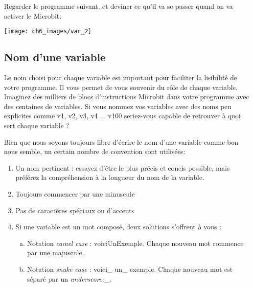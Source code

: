 \documentclass[11pt, a4paper]{book}
\begin{document}
	
	

	
	
	
\begin{exercice}
 Regarder le programme suivant, et deviner ce qu'il va se passer quand on va activer le Microbit:

\begin{center}
\texttt{[image: ch6\_images/var\_2]}
\end{center}
\end{exercice}






\subsection{Nom d'une variable}
Le nom choisi pour chaque variable est important pour faciliter la lisibilité de votre programme. Il vous permet de vous souvenir du rôle de chaque variable. Imaginez des milliers de blocs d'instructions Microbit dans votre programme avec des centaines de variables. Si vous nommez vos variables avec des noms peu explicites comme v1, v2, v3, v4 ... v100 seriez-vous capable de retrouver à quoi sert chaque variable ?

Bien que nous soyons toujours libre d'écrire le nom d'une variable comme bon nous semble, un certain nombre de convention sont utilisées:
\begin{enumerate}[1)]
\item Un nom pertinent : essayez d'être le plus précis et concis possible, mais préférez la compréhension à la longueur du nom de la variable. 
\item Toujours commencer par une minuscule
\item Pas de caractères spéciaux ou d'accents
\item Si une variable est un mot composé, deux solutions s'offrent à vous :
\begin{enumerate}[a)] 
\item Notation {\it camel case} : voiciUnExemple. Chaque nouveau mot commence par une majuscule.
\item  Notation {\it snake case} : voici\_ un\_ exemple. Chaque nouveau mot est séparé par un {\it underscore}:\_.

\end{enumerate}
\end{enumerate}
\end{document}
